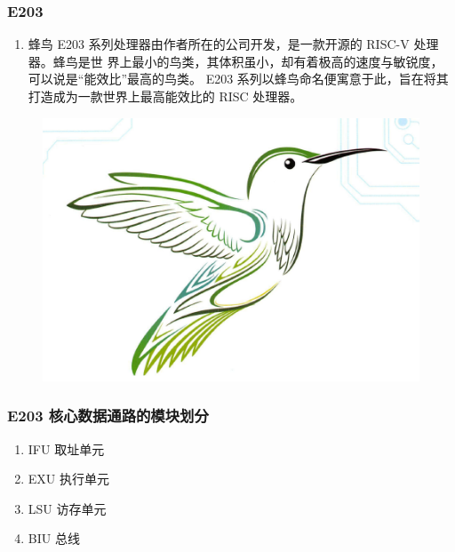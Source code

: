 \documentclass[a4paper, 14pt, oneside]{book} %
\numberwithin{equation}{subsection}
\begin{document}
			\subsubsection{E203}
				\begin{enumerate}
					\item 
						蜂鸟 E203 系列处理器由作者所在的公司开发，是一款开源的 RISC-V 处理器。蜂鸟是世
						界上最小的鸟类，其体积虽小，却有着极高的速度与敏锐度，可以说是“能效比”最高的鸟类。
						E203 系列以蜂鸟命名便寓意于此，旨在将其打造成为一款世界上最高能效比的 RISC 处理器。
				\end{enumerate}	
				\begin{figure}[H]
					\centering
					\includegraphics[scale=0.8]{img/four.png}
				\end{figure}
					
			\subsubsection{E203 核心数据通路的模块划分}
				\begin{enumerate}
					\item 
						IFU 取址单元
					\item 
						EXU 执行单元
					\item 
						LSU 访存单元
					\item 
						BIU 总线
				\end{enumerate}	
\end{document}

